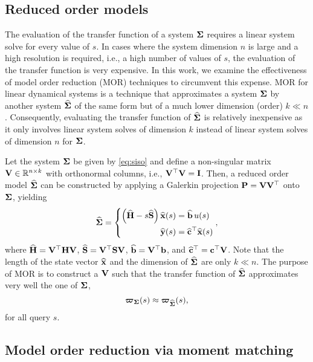 \subsection{Reduced order models}
\label{lds:mor}

The evaluation of the transfer function of a system $\mathbf{\Sigma}$ requires a linear system solve for every value of $s$. In cases where the system dimension $n$ is large and a high resolution is required, i.e., a high number of values of $s$, the evaluation of the transfer function is very expensive. In this work, we examine the effectiveness of model order reduction (MOR) techniques to circumvent this expense. MOR for linear dynamical systems is a technique that approximates a system $\mathbf{\Sigma}$ by another system $\widehat{\mathbf{\Sigma}}$ of the same form but of a much lower dimension (order) $k \ll n$. Consequently, evaluating the transfer function of $\widehat{\mathbf{\Sigma}}$ is relatively inexpensive as it only involves linear system solves of dimension $k$ instead of linear system solves of dimension $n$ for $\mathbf{\Sigma}$.

Let the system $\mathbf{\Sigma}$ be given by \eqref{eq:siso} and define a non-singular matrix $\bV \inR[n][k]$ with orthonormal columns, i.e., $\mathbf{V}^\top \mathbf{V} = \mathbf{I}$. Then, a reduced order model $\widehat{\mathbf{\Sigma}}$ can be constructed by applying a Galerkin projection $\mathbf{P} = \mathbf{V}\mathbf{V}^\top$ onto $\mathbf{\Sigma}$, yielding
\begin{equation}
  \widehat{\mathbf{\Sigma}} = \left\{\begin{aligned}
    \left( \widehat{\mathbf{H}} - s\widehat{\mathbf{S}} \right) \widehat{\mathbf{x}}(s) &= \widehat{\mathbf{b}}\,u(s) \\
                                \widehat{\mathbf{y}}(s) &= \widehat{\mathbf{c}}^\top \widehat{\mathbf{x}}(s)
  \end{aligned}\right.,
\end{equation}
where $\widehat{\mathbf{H}} = \mathbf{V}^\top \mathbf{H} \mathbf{V}$, $\widehat{\mathbf{S}} = \mathbf{V}^\top \mathbf{S} \mathbf{V}$, $\widehat{\mathbf{b}} = \mathbf{V}^\top \mathbf{b}$, and $\widehat{\mathbf{c}}^\top = \mathbf{c}^\top \mathbf{V}$. Note that the length of the state vector $\widehat{\mathbf{x}}$ and the dimension of $\widehat{\mathbf{\Sigma}}$ are only $k \ll n$. The purpose of MOR is to construct a $\mathbf{V}$ such that the transfer function of $\widehat{\mathbf{\Sigma}}$ approximates very well the one of $\mathbf{\Sigma}$,
\begin{equation}
  \boldsymbol{\varpi}_{\mathbf{\Sigma}}(s) \approx \boldsymbol{\varpi}_{\widehat{\mathbf{\Sigma}}}(s),
  \label{eq:tf-match}
\end{equation}
for all query $s$.

\subsection{Model order reduction via moment matching}
\label{lds:mm}


